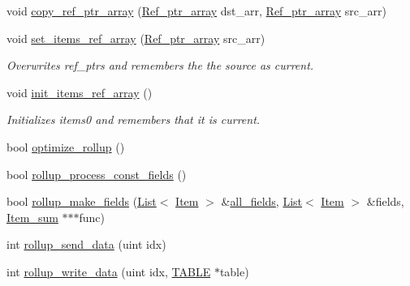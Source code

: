 \begin{DoxyCompactItemize}
\item 
void \mbox{\hyperlink{classJOIN_acce1ebb89b6ce7cacb5afdabf72d8f1a}{copy\+\_\+ref\+\_\+ptr\+\_\+array}} (\mbox{\hyperlink{classBounds__checked__array}{Ref\+\_\+ptr\+\_\+array}} dst\+\_\+arr, \mbox{\hyperlink{classBounds__checked__array}{Ref\+\_\+ptr\+\_\+array}} src\+\_\+arr)
\item 
\mbox{\label{classJOIN_a90e9fefe03b9ff58097f8dc1e3479522}} 
void \mbox{\hyperlink{classJOIN_a90e9fefe03b9ff58097f8dc1e3479522}{set\+\_\+items\+\_\+ref\+\_\+array}} (\mbox{\hyperlink{classBounds__checked__array}{Ref\+\_\+ptr\+\_\+array}} src\+\_\+arr)
\begin{DoxyCompactList}\small\item\em Overwrites \textquotesingle{}ref\+\_\+ptrs\textquotesingle{} and remembers the the source as \textquotesingle{}current\textquotesingle{}. \end{DoxyCompactList}\item 
\mbox{\label{classJOIN_a660825c0cb1fc93270b5436f65878121}} 
void \mbox{\hyperlink{classJOIN_a660825c0cb1fc93270b5436f65878121}{init\+\_\+items\+\_\+ref\+\_\+array}} ()
\begin{DoxyCompactList}\small\item\em Initializes \textquotesingle{}items0\textquotesingle{} and remembers that it is \textquotesingle{}current\textquotesingle{}. \end{DoxyCompactList}\item 
bool \mbox{\hyperlink{group__Query__Optimizer_gaac99b2256ee62ddd1a435289c2acb8e2}{optimize\+\_\+rollup}} ()
\item 
bool \mbox{\hyperlink{group__Query__Optimizer_ga076b7e6736c0bf0a9e9bf7542e4746c8}{rollup\+\_\+process\+\_\+const\+\_\+fields}} ()
\item 
bool \mbox{\hyperlink{group__Query__Optimizer_ga7e92b14b52e210ce225ad4c0312f9bca}{rollup\+\_\+make\+\_\+fields}} (\mbox{\hyperlink{classList}{List}}$<$ \mbox{\hyperlink{classItem}{Item}} $>$ \&\mbox{\hyperlink{classJOIN_a6664196553f3202cfc4e740358d6bc0d}{all\+\_\+fields}}, \mbox{\hyperlink{classList}{List}}$<$ \mbox{\hyperlink{classItem}{Item}} $>$ \&fields, \mbox{\hyperlink{classItem__sum}{Item\+\_\+sum}} $\ast$$\ast$$\ast$func)
\item 
int \mbox{\hyperlink{group__Query__Executor_ga148b2123bee3ebd0718d334e9f109db8}{rollup\+\_\+send\+\_\+data}} (uint idx)
\item 
int \mbox{\hyperlink{group__Query__Executor_ga15c9baf548fef3d59f993a3c13575593}{rollup\+\_\+write\+\_\+data}} (uint idx, \mbox{\hyperlink{structTABLE}{T\+A\+B\+LE}} $\ast$table)

\end{DoxyCompactItemize}
